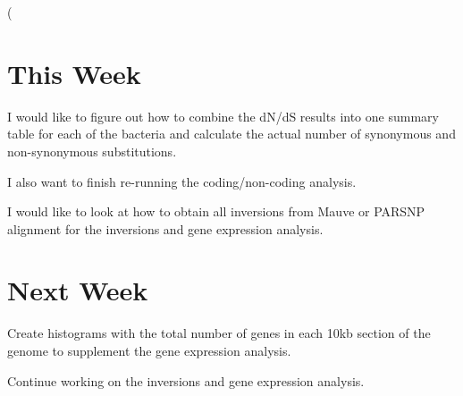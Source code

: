 \left( \documentclass[12pt]{article}
\begin{document}

\section*{This Week}
%
I would like to figure out how to combine the dN/dS results into one summary table for each of the bacteria and calculate the actual number of synonymous and non-synonymous substitutions.

I also want to finish re-running the coding/non-coding analysis.

I would like to look at how to obtain all inversions from Mauve or PARSNP alignment for the inversions and gene expression analysis.
 
\section*{Next Week}

Create histograms with the total number of genes in each 10kb section of the genome to supplement the gene expression analysis.

Continue working on the inversions and gene expression analysis.
\newpage



%				
%				
\end{document}
